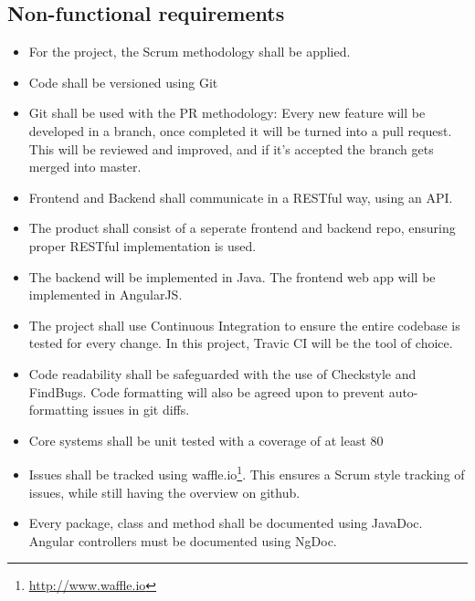 \subsection{Non-functional requirements}
\begin{itemize}

\item For the project, the Scrum methodology shall be applied.

\item Code shall be versioned using Git

\item Git shall be used with the PR methodology: Every new feature will be developed in a branch, once completed it will be turned into a pull request. This will be reviewed and improved, and if it's accepted the branch gets merged into master.

\item Frontend and Backend shall communicate in a RESTful way, using an API.

\item The product shall consist of a seperate frontend and backend repo, ensuring proper RESTful implementation is used.

\item The backend will be implemented in Java. The frontend web app will be implemented in AngularJS. 

\item The project shall use Continuous Integration to ensure the entire codebase is tested for every change. In this project, Travic CI will be the tool of choice.

\item Code readability shall be safeguarded with the use of Checkstyle and FindBugs. Code formatting will also be agreed upon to prevent auto-formatting issues in git diffs.

\item Core systems shall be unit tested with a coverage of at least 80%

\item Issues shall be tracked using waffle.io\footnote{\url{http://www.waffle.io}}. This ensures a Scrum style tracking of issues, while still having the overview on github.

\item Every package, class and method shall be documented using JavaDoc. Angular controllers must be documented using NgDoc. 

\end{itemize}

